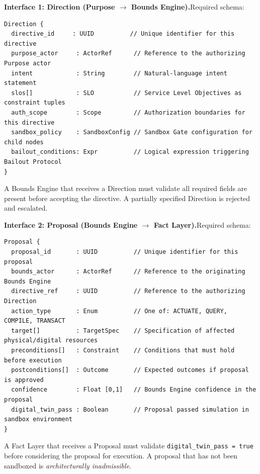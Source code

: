 \documentclass[12pt]{article}
\theoremstyle{plain}
\begin{document}
\vspace{0.5em}
\noindent\textbf{Interface 1: Direction (Purpose $\rightarrow$ Bounds Engine).}\hspace{1em}Required schema:
\begin{verbatim}
Direction {
  directive_id     : UUID          // Unique identifier for this directive
  purpose_actor     : ActorRef      // Reference to the authorizing Purpose actor
  intent            : String        // Natural-language intent statement
  slos[]            : SLO           // Service Level Objectives as constraint tuples
  auth_scope        : Scope         // Authorization boundaries for this directive
  sandbox_policy    : SandboxConfig // Sandbox Gate configuration for child nodes
  bailout_conditions: Expr          // Logical expression triggering Bailout Protocol
}
\end{verbatim}
A Bounds Engine that receives a Direction must validate all required fields are present before accepting the directive. A partially specified Direction is rejected and escalated.

\vspace{0.5em}
\noindent\textbf{Interface 2: Proposal (Bounds Engine $\rightarrow$ Fact Layer).}\hspace{1em}Required schema:
\begin{verbatim}
Proposal {
  proposal_id       : UUID          // Unique identifier for this proposal
  bounds_actor      : ActorRef      // Reference to the originating Bounds Engine
  directive_ref     : UUID          // Reference to the authorizing Direction
  action_type       : Enum          // One of: ACTUATE, QUERY, COMPILE, TRANSACT
  target[]          : TargetSpec    // Specification of affected physical/digital resources
  preconditions[]   : Constraint    // Conditions that must hold before execution
  postconditions[]  : Outcome       // Expected outcomes if proposal is approved
  confidence        : Float [0,1]   // Bounds Engine confidence in the proposal
  digital_twin_pass : Boolean       // Proposal passed simulation in sandbox environment
}
\end{verbatim}
A Fact Layer that receives a Proposal must validate \texttt{digital\_twin\_pass = true} before considering the proposal for execution. A proposal that has not been sandboxed is \textit{architecturally inadmissible}.
\end{document}
